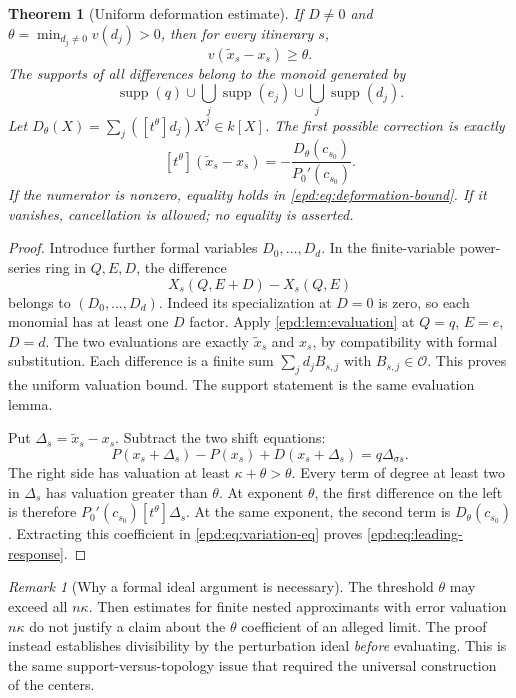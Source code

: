 \documentclass[11pt,a4paper]{article}
\numberwithin{equation}{section}
\newtheorem{theorem}{Theorem}[section]
\theoremstyle{plain}
\theoremstyle{definition}
\theoremstyle{remark}
\newtheorem{remark}[remark]{Remark}
\newcommand{\OO}{\mathcal O}
\newcommand{\sh}{\sigma}
\newcommand{\supp}{\operatorname{supp}}
\newcommand{\coeff}[2]{[t^{#1}]#2}
\begin{document}
\begin{theorem}[Uniform deformation estimate]\label{epd:thm:deformation}
If $D\ne0$ and $\theta=\min_{d_j\ne0}v(d_j)>0$, then for every
itinerary $s$,
\begin{equation}\label{epd:eq:deformation-bound}
 v(\widetilde x_s-x_s)\geq\theta.
\end{equation}
The supports of all differences belong to the monoid generated by
\[
 \supp(q)\cup\bigcup_j\supp(e_j)\cup\bigcup_j\supp(d_j).
\]
Let $D_\theta(X)=\sum_j(\coeff{\theta}{d_j})X^j\in k[X]$. The first
possible correction is exactly
\begin{equation}\label{epd:eq:leading-response}
 \coeff{\theta}{(\widetilde x_s-x_s)}
 =-\frac{D_\theta(c_{s_0})}{P_0'(c_{s_0})}.
\end{equation}
If the numerator is nonzero, equality holds in
\eqref{epd:eq:deformation-bound}. If it vanishes, cancellation is allowed;
no equality is asserted.
\end{theorem}
\begin{proof}
Introduce further formal variables $D_0,\ldots,D_d$. In the
finite-variable power-series ring in $Q,E,D$, the difference
\[
 X_s(Q,E+D)-X_s(Q,E)
\]
belongs to $(D_0,\ldots,D_d)$. Indeed its specialization at $D=0$ is
zero, so each monomial has at least one $D$ factor. Apply
\cref{epd:lem:evaluation} at $Q=q$, $E=e$, $D=d$. The two evaluations
are exactly $\widetilde x_s$ and $x_s$, by compatibility with formal
substitution. Each difference is a finite sum $\sum_jd_jB_{s,j}$ with
$B_{s,j}\in\OO$. This proves the uniform valuation bound. The support
statement is the same evaluation lemma.

Put $\Delta_s=\widetilde x_s-x_s$. Subtract the two shift equations:
\begin{equation}\label{epd:eq:variation-eq}
 P(x_s+\Delta_s)-P(x_s)+D(x_s+\Delta_s)
       =q\Delta_{\sh s}.
\end{equation}
The right side has valuation at least $\kappa+\theta>\theta$.
Every term of degree at least two in $\Delta_s$ has valuation greater
than $\theta$. At exponent $\theta$, the first difference on the left
is therefore $P_0'(c_{s_0})\coeff{\theta}{\Delta_s}$. At the same
exponent, the second term is $D_\theta(c_{s_0})$. Extracting this
coefficient in \eqref{epd:eq:variation-eq} proves
\eqref{epd:eq:leading-response}.
\end{proof}

\begin{remark}[Why a formal ideal argument is necessary]\label{epd:rem:formal-ideal}
The threshold $\theta$ may exceed all $n\kappa$. Then estimates for
finite nested approximants with error valuation $n\kappa$ do not
justify a claim about the $\theta$ coefficient of an alleged limit.
The proof instead establishes divisibility by the perturbation ideal
\emph{before} evaluating. This is the same support-versus-topology
issue that required the universal construction of the centers.
\end{remark}
\end{document}
